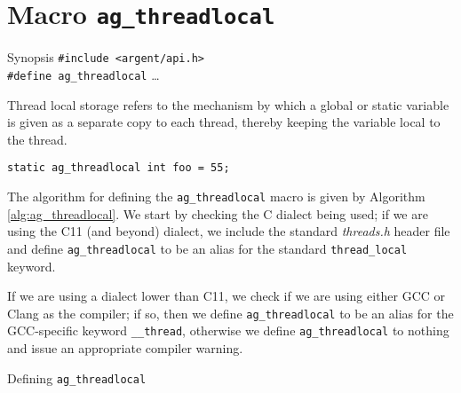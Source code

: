 %


\section{Macro \texttt{ag\_threadlocal}}

\begin{bclogo}[logo=\bccrayon, noborder=true, barre=snake, couleurBarre=gray]
  {Synopsis}
  \small
  \verb|#include <argent/api.h>| \\
  \verb|#define ag_threadlocal| \ldots
\end{bclogo}

Thread local storage refers to the mechanism by which a global or static
variable is given as a separate copy to each thread, thereby keeping the 
variable local to the thread.

\begin{lstlisting}[linewidth=1.0\linewidth,
    caption=Example use of ag\_threadlocal]
  static ag_threadlocal int foo = 55;
\end{lstlisting}

The algorithm for defining the \verb|ag_threadlocal| macro is given by Algorithm
\ref{alg:ag_threadlocal}. We start by checking the C dialect being used; if we
are using the C11 (and beyond) dialect, we include the standard \emph{threads.h} 
header file and define \verb|ag_threadlocal| to be an alias for
the standard \verb|thread_local| keyword.

If we are using a dialect lower than C11, we check if we are using either GCC or
Clang as the compiler; if so, then we define \verb|ag_threadlocal| to be an 
alias for the GCC-specific keyword \verb|__thread|, otherwise we define
\verb|ag_threadlocal| to nothing and issue an appropriate compiler warning.
  \begin{algorithm}
    \scriptsize
    \caption{Defining \texttt{ag\_threadlocal}}
    \label{alg:ag_threadlocal}
  \begin{algorithmic}
    \Else
    \EndIf
  \end{algorithmic}
  \end{algorithm}
